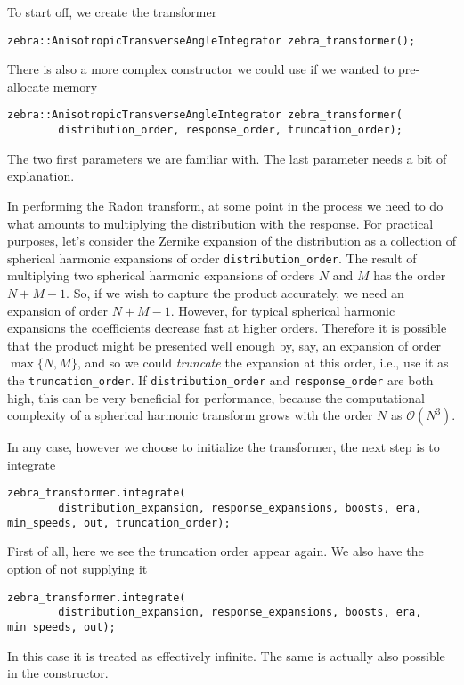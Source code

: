 \documentclass{article}
\begin{document}
To start off, we create the transformer
\begin{verbatim}
zebra::AnisotropicTransverseAngleIntegrator zebra_transformer();
\end{verbatim}
There is also a more complex constructor we could use if we wanted to pre-allocate memory
\begin{verbatim}
zebra::AnisotropicTransverseAngleIntegrator zebra_transformer(
        distribution_order, response_order, truncation_order);
\end{verbatim}
The two first parameters we are familiar with. The last parameter needs a bit of explanation.

In performing the Radon transform, at some point in the process we need to do what amounts to multiplying the distribution with the response. For practical purposes, let's consider the Zernike expansion of the distribution as a collection of spherical harmonic expansions of order \texttt{distribution_order}. The result of multiplying two spherical harmonic expansions of orders $N$ and $M$ has the order $N + M - 1$. So, if we wish to capture the product accurately, we need an expansion of order $N + M - 1$. However, for typical spherical harmonic expansions the coefficients decrease fast at higher orders. Therefore it is possible that the product might be presented well enough by, say, an expansion of order $\max\{N,M\}$, and so we could \emph{truncate} the expansion at this order, i.e., use it as the \texttt{truncation_order}. If \texttt{distribution_order} and \texttt{response_order} are both high, this can be very beneficial for performance, because the computational complexity of a spherical harmonic transform grows with the order $N$ as $\mathcal{O}(N^3)$.

In any case, however we choose to initialize the transformer, the next step is to integrate
\begin{verbatim}
zebra_transformer.integrate(
        distribution_expansion, response_expansions, boosts, era, min_speeds, out, truncation_order);
\end{verbatim}
First of all, here we see the truncation order appear again. We also have the option of not supplying it
\begin{verbatim}
zebra_transformer.integrate(
        distribution_expansion, response_expansions, boosts, era, min_speeds, out);
\end{verbatim}
In this case it is treated as effectively infinite. The same is actually also possible in the constructor.
\end{document}
